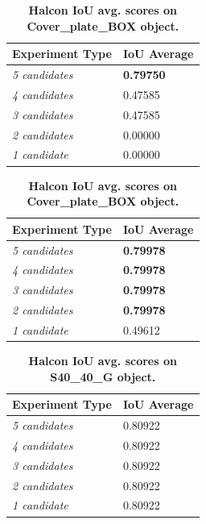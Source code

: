 \begin{table}[!hbt]
\parbox{.45\linewidth}{
	\centering
    \begin{tabular}{| l | l |}
    \hline
    \textbf{Experiment Type} & \textbf{IoU Average} \\ \hline
    \emph{5 candidates} & \textbf{0.79750} \\
    \emph{4 candidates} & 0.47585 \\
    \emph{3 candidates} & 0.47585 \\
    \emph{2 candidates} & 0.00000 \\
    \emph{1 candidate} & 0.00000 \\
    \hline
    \end{tabular}
    \caption{\textbf{Halcon IoU avg. scores on M20\_100 object.}}
    \label{tab:halcon_M20_100_results}
}
\hfill
\parbox{.45\linewidth}{
	\centering
    \begin{tabular}{| l | l |}
    \hline
    \textbf{Experiment Type} & \textbf{IoU Average} \\ \hline
    \emph{5 candidates} & \textbf{0.79978} \\
    \emph{4 candidates} & \textbf{0.79978} \\
    \emph{3 candidates} & \textbf{0.79978} \\
    \emph{2 candidates} & \textbf{0.79978} \\
    \emph{1 candidate} & 0.49612 \\
    \hline
    \end{tabular}
    \caption{\textbf{Halcon IoU avg. scores on Cover\_plate\_BOX object.}}
    \label{tab:halcon_Cover_plate_BOX_results}
}
\end{table}

\begin{table}[!hbt]
	\centering
    \begin{tabular}{| l | l |}
    \hline
    \textbf{Experiment Type} & \textbf{IoU Average} \\ \hline
    \emph{5 candidates} & 0.80922 \\
    \emph{4 candidates} & 0.80922 \\
    \emph{3 candidates} & 0.80922 \\
    \emph{2 candidates} & 0.80922 \\
    \emph{1 candidate} & 0.80922 \\
    \hline
    \end{tabular}
    \caption{\textbf{Halcon IoU avg. scores on S40\_40\_G object.}}
    \label{tab:halcon_S40_40_G_results}
\end{table}

